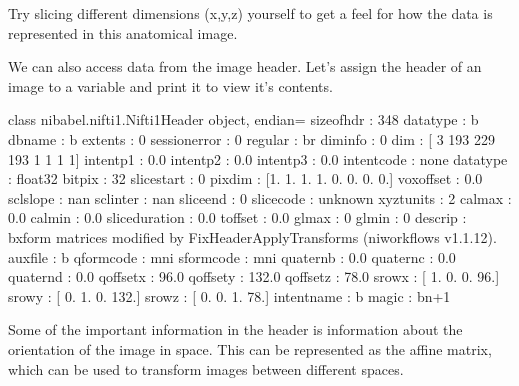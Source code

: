 \documentclass[letterpaper,10pt,english]{sphinxmanual}
\begin{document}
Try slicing different dimensions (x,y,z) yourself to get a feel for how the data is represented in this anatomical image.

We can also access data from the image header. Let’s assign the header of an image to a variable and print it to view it’s contents.

\begin{sphinxVerbatim}[commandchars=\\\{\}]
  
\end{sphinxVerbatim}

\begin{sphinxVerbatim}[commandchars=\\\{\}]
\PYGZlt{}class \PYGZsq{}nibabel.nifti1.Nifti1Header\PYGZsq{}\PYGZgt{} object, endian=\PYGZsq{}\PYGZlt{}\PYGZsq{}
sizeof\PYGZus{}hdr      : 348
data\PYGZus{}type       : b\PYGZsq{}\PYGZsq{}
db\PYGZus{}name         : b\PYGZsq{}\PYGZsq{}
extents         : 0
session\PYGZus{}error   : 0
regular         : b\PYGZsq{}r\PYGZsq{}
dim\PYGZus{}info        : 0
dim             : [  3 193 229 193   1   1   1   1]
intent\PYGZus{}p1       : 0.0
intent\PYGZus{}p2       : 0.0
intent\PYGZus{}p3       : 0.0
intent\PYGZus{}code     : none
datatype        : float32
bitpix          : 32
slice\PYGZus{}start     : 0
pixdim          : [1. 1. 1. 1. 0. 0. 0. 0.]
vox\PYGZus{}offset      : 0.0
scl\PYGZus{}slope       : nan
scl\PYGZus{}inter       : nan
slice\PYGZus{}end       : 0
slice\PYGZus{}code      : unknown
xyzt\PYGZus{}units      : 2
cal\PYGZus{}max         : 0.0
cal\PYGZus{}min         : 0.0
slice\PYGZus{}duration  : 0.0
toffset         : 0.0
glmax           : 0
glmin           : 0
descrip         : b\PYGZsq{}xform matrices modified by FixHeaderApplyTransforms (niworkflows v1.1.12).\PYGZsq{}
aux\PYGZus{}file        : b\PYGZsq{}\PYGZsq{}
qform\PYGZus{}code      : mni
sform\PYGZus{}code      : mni
quatern\PYGZus{}b       : 0.0
quatern\PYGZus{}c       : 0.0
quatern\PYGZus{}d       : 0.0
qoffset\PYGZus{}x       : \PYGZhy{}96.0
qoffset\PYGZus{}y       : \PYGZhy{}132.0
qoffset\PYGZus{}z       : \PYGZhy{}78.0
srow\PYGZus{}x          : [  1.   0.   0. \PYGZhy{}96.]
srow\PYGZus{}y          : [   0.    1.    0. \PYGZhy{}132.]
srow\PYGZus{}z          : [  0.   0.   1. \PYGZhy{}78.]
intent\PYGZus{}name     : b\PYGZsq{}\PYGZsq{}
magic           : b\PYGZsq{}n+1\PYGZsq{}
\end{sphinxVerbatim}

Some of the important information in the header is information about the orientation of the image in space. This can be represented as the affine matrix, which can be used to transform images between different spaces.
\end{document}
